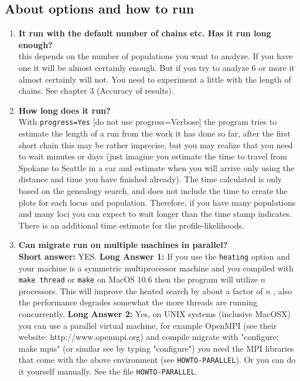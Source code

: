 \subsection{About options and how to run}
\begin{enumerate}
\item {\bf It run with the default number of chains etc. Has it run
long enough?}\\
this depends on the number of populations you want to analyze.
If you have one it will be almost certainly enough. But if you
try to analyze 6 or more it almost certainly will not. You need to experiment a little with the length of chains. See chapter 3 (Accuracy of results).
\item {\bf How long does it run?}\\
With {\tt progress=Yes} [do not use progress=Verbose] the program tries to estimate the length
of a run from the work it has done so far, after the first short chain
this may be rather imprecise, but you may realize that you need to
wait minutes or days (just imagine you estimate the time to travel
from Spokane to Seattle in a car and estimate when you will arrive
only using the distance and time you have finished already).
The time calculated is only based on the genealogy
search, and does not include the time to create the plots for each
locus and population. Therefore, if you have many populations and many loci
you can expect to wait longer than the time stamp indicates. There is
an additional time estimate for the profile-likelihoods.
\item {\bf Can migrate run on multiple machines in parallel?}\\
{\bf Short answer:} YES. {\bf Long Answer 1:} If you use the {\tt heating} option
and your machine is a symmetric multiprocessor machine and you 
compiled with {\tt make thread} or {\tt make} on MacOS 10.6 then the program will utilize $n$ 
processors. This will improve the heated search by about a factor of $n$
, also the performance degrades somewhat the more threads are running
concurrently.
{\bf Long Answer 2:} Yes, on UNIX systems (inclusive MacOSX) you can use a parallel virtual machine, for example OpenMPI (see their website: http://www.openmpi.org)
and compile migrate with "configure; make mpis" (or similar see by typing "configure") you need the MPI libraries that come with
the above environment (see {\tt HOWTO-PARALLEL}). Or you 
can do it yourself manually. See
the file {\tt HOWTO-PARALLEL}.
\end{enumerate}

